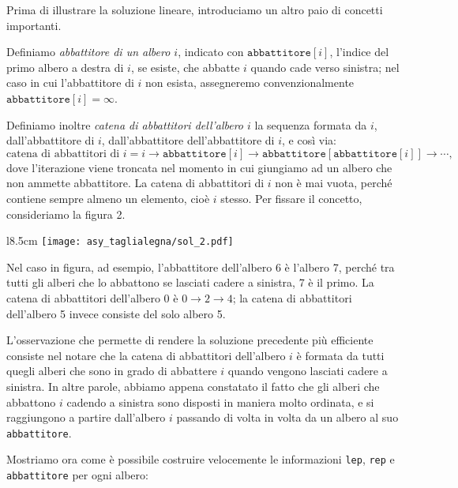 \N
Prima di illustrare la soluzione lineare, introduciamo un altro paio di concetti importanti.

Definiamo \emph{abbattitore di un albero $i$}, indicato con $\texttt{abbattitore}[i]$, l'indice del primo albero a destra di $i$, se esiste, che abbatte $i$ quando cade verso sinistra; nel caso in cui l'abbattitore di $i$ non esista, assegneremo convenzionalmente $\texttt{abbattitore}[i] = \infty$.

Definiamo inoltre \emph{catena di abbattitori dell'albero $i$} la sequenza formata da $i$, dall'abbattitore di $i$, dall'abbattitore dell'abbattitore di $i$, e così via: $$\text{catena di abbattitori di }i = i\rightarrow\texttt{abbattitore}[i]\rightarrow\texttt{abbattitore}[\texttt{abbattitore}[i]]\rightarrow \cdots,$$ dove l'iterazione viene troncata nel momento in cui giungiamo ad un albero che non ammette abbattitore. La catena di abbattitori di $i$ non è mai vuota, perché contiene sempre almeno un elemento, cioè $i$ stesso. Per fissare il concetto, consideriamo la figura 2.

\begin{wrapfigure}{l}{8.5cm}
	\vspace*{-.5cm}
	\centering\texttt{[image: asy\_taglialegna/sol\_2.pdf]}
	\caption{}
	\label{fig:sol2}
    \vspace*{-.6cm}
\end{wrapfigure}
Nel caso in figura, ad esempio, l'abbattitore dell'albero 6 è l'albero 7, perché tra tutti gli alberi che lo abbattono se lasciati cadere a sinistra, 7 è il primo. La catena di abbattitori dell'albero 0 è $0\rightarrow 2\rightarrow 4$; la catena di abbattitori dell'albero 5 invece consiste del solo albero 5.

L'osservazione che permette di rendere la soluzione precedente più efficiente consiste nel notare che la catena di abbattitori dell'albero $i$ è formata da tutti quegli alberi che sono in grado di abbattere $i$ quando vengono lasciati cadere a sinistra. In altre parole, abbiamo appena constatato il fatto che gli alberi che abbattono $i$ cadendo a sinistra sono disposti in maniera molto ordinata, e si raggiungono a partire dall'albero $i$ passando di volta in volta da un albero al suo \texttt{abbattitore}.

Mostriamo ora come è possibile costruire velocemente le informazioni \texttt{lep}, \texttt{rep} e \texttt{abbattitore} per ogni albero:

\begin{minipage}[b][2.7cm][t]{.47\textwidth}
	\colorbox{white}{}
\end{minipage}
\hfill
\begin{minipage}[b][2.7cm][t]{.51\textwidth}
	\colorbox{white}{}
\end{minipage}

